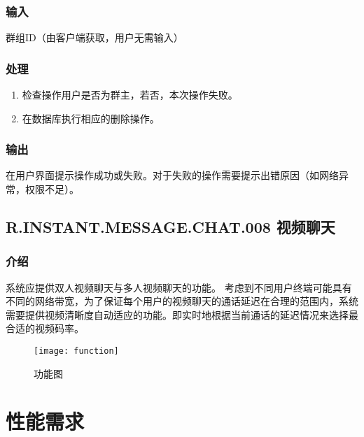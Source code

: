 \subsubsection{输入}
群组ID（由客户端获取，用户无需输入）
\subsubsection{处理}
\begin{enumerate}
	\item 检查操作用户是否为群主，若否，本次操作失败。
	\item 在数据库执行相应的删除操作。
\end{enumerate}
\subsubsection{输出}
在用户界面提示操作成功或失败。对于失败的操作需要提示出错原因（如网络异常，权限不足）。
\subsection{R.INSTANT.MESSAGE.CHAT.008 视频聊天}
\subsubsection{介绍}
系统应提供双人视频聊天与多人视频聊天的功能。
{
	\color{red}
	考虑到不同用户终端可能具有不同的网络带宽，为了保证每个用户的视频聊天的通话延迟在合理的范围内，系统需要提供视频清晰度自动适应的功能。即实时地根据当前通话的延迟情况来选择最合适的视频码率。\\
}
\begin{figure}[h]
	\centering
	\texttt{[image: function]}
	\caption{功能图} \label{fig:function}
\end{figure}

\section{性能需求}

